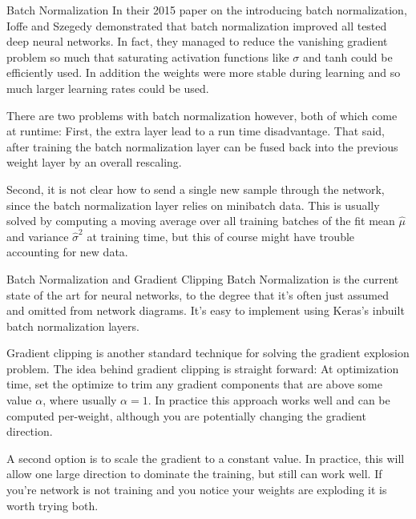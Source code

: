 \documentclass[10pt, table, dvipsnames,xcdraw,handout]{beamer}
\begin{document}
\begin{frame}[fragile]{Batch Normalization}
In their 2015 paper on the introducing batch normalization, Ioffe and Szegedy demonstrated that batch normalization improved all tested deep neural networks. In fact,  they managed to reduce the vanishing gradient problem so much that saturating activation functions like $\sigma$ and tanh could be efficiently used. In addition the weights were more stable during learning and so much larger learning rates could be used. \pause

There are two problems with batch normalization however, both of which come at runtime: First, the extra layer lead to a run time disadvantage. That said, after training the batch normalization layer can be fused back into the previous weight layer by an overall rescaling. \pause

Second, it is not clear how to send a single new sample through the network, since the batch normalization layer relies on minibatch data. This is usually solved by computing a moving average over all training batches of the fit mean $\hat{\mu}$ and variance $\hat{\sigma}^2$ at training time, but this of course might have trouble accounting for new data. 

\end{frame}




\begin{frame}[fragile]{Batch Normalization and Gradient Clipping}
Batch Normalization is the current state of the art for neural networks, to the degree that it's often just assumed and omitted from network diagrams. It's easy to implement using Keras's inbuilt batch normalization layers.\pause

Gradient clipping is another standard technique for solving the gradient explosion problem. The idea behind gradient clipping is straight forward: At optimization time, set the optimize to trim any gradient components that are above some value $\alpha$, where usually $\alpha = 1$. In practice this approach works well and can be computed per-weight, although you are potentially changing the gradient direction. \pause

A second option is to scale the gradient to a constant value. In practice, this will allow one large direction to dominate the training, but still can work well. If you're network is not training and you notice your weights are exploding it is worth trying both. 
\end{frame}
\end{document}
